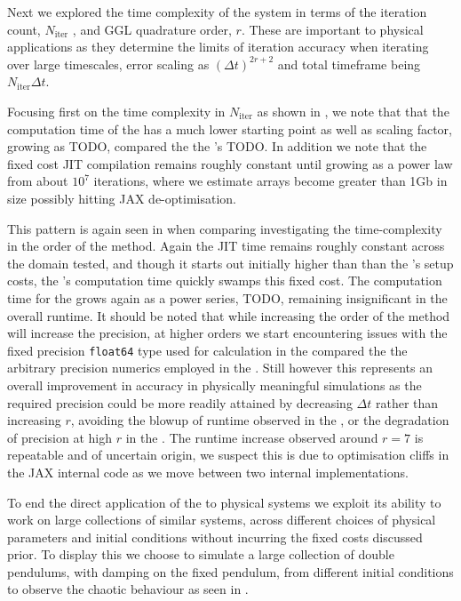 Next we explored the time complexity of the system in terms of the iteration count, $N_{\text{iter}}$ , and GGL quadrature order, $r$. These are important to physical applications as they determine the limits of iteration accuracy when iterating over large timescales, error scaling as $(\Delta t)^{2r + 2}$  and total timeframe being $N_{\text{iter}} \Delta t$.

Focusing first on the time complexity in $N_{\text{iter}}$ as shown in , we note that that the computation time of the \updimpl{} has a much lower starting point as well as scaling factor, growing as TODO, compared the the \orgimpl{}'s TODO. In addition we note that the fixed cost JIT compilation remains roughly constant until growing as a power law from about $10^7$ iterations, where we estimate arrays become greater than 1Gb in size possibly hitting JAX de-optimisation.

This pattern is again seen in  when comparing investigating the time-complexity in the order of the method. Again the JIT time remains roughly constant across the domain tested, and though it starts out initially higher than than the \orgimpl{}'s setup costs, the \orgimpl{}'s computation time quickly swamps this fixed cost. The computation time for the \updimpl{} grows again as a power series, TODO, remaining insignificant in the overall runtime. It should be noted that while increasing the order of the method will increase the precision, at higher orders we start encountering issues with the fixed precision \texttt{float64} type used for calculation in the \updimpl{} compared the the arbitrary precision numerics employed in the \orgimpl{}. Still however this represents an overall improvement in accuracy in physically meaningful simulations as the required precision could be more readily attained by decreasing $\Delta t$ rather than increasing $r$, avoiding the blowup of runtime observed in the \orgimpl{}, or the degradation of precision at high $r$ in the \updimpl{}. The runtime increase observed around $r = 7$ is repeatable and of uncertain origin, we suspect this is due to optimisation cliffs in the JAX internal code as we move between two internal implementations. 

To end the direct application of the \updimpl{} to physical systems we exploit its ability to work on large collections of similar systems, across different choices of physical parameters and initial conditions without incurring the fixed costs discussed prior. To display this we choose to simulate a large collection of double pendulums, with damping on the fixed pendulum, from different initial conditions to observe the chaotic behaviour as seen in .


